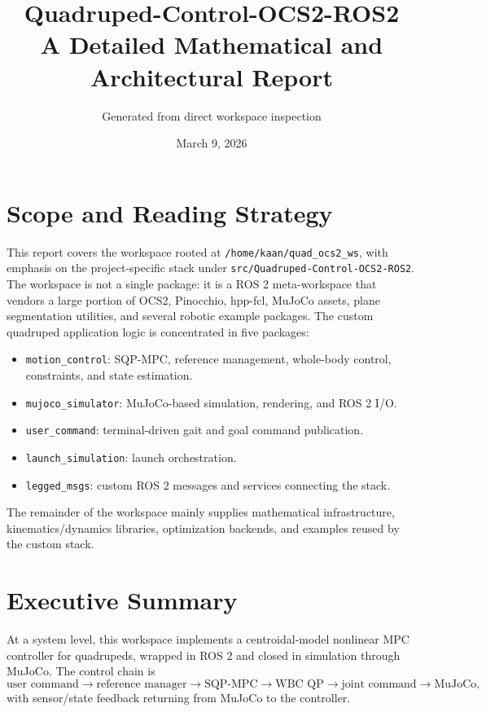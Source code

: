 \documentclass[11pt,a4paper]{article}
\title{\textbf{Quadruped-Control-OCS2-ROS2}\\A Detailed Mathematical and Architectural Report}
\author{Generated from direct workspace inspection}
\date{March 9, 2026}
\newcommand{\code}[1]{\texttt{#1}}
\begin{document}
\maketitle
\tableofcontents
\clearpage

\section{Scope and Reading Strategy}
This report covers the workspace rooted at \code{/home/kaan/quad\_ocs2\_ws}, with emphasis on the project-specific stack under \code{src/Quadruped-Control-OCS2-ROS2}. The workspace is not a single package: it is a ROS 2 meta-workspace that vendors a large portion of OCS2, Pinocchio, hpp-fcl, MuJoCo assets, plane segmentation utilities, and several robotic example packages. The custom quadruped application logic is concentrated in five packages:
\begin{itemize}[leftmargin=*]
\item \code{motion_control}: SQP-MPC, reference management, whole-body control, constraints, and state estimation.
\item \code{mujoco_simulator}: MuJoCo-based simulation, rendering, and ROS 2 I/O.
\item \code{user_command}: terminal-driven gait and goal command publication.
\item \code{launch_simulation}: launch orchestration.
\item \code{legged_msgs}: custom ROS 2 messages and services connecting the stack.
\end{itemize}

The remainder of the workspace mainly supplies mathematical infrastructure, kinematics/dynamics libraries, optimization backends, and examples reused by the custom stack.

\section{Executive Summary}
At a system level, this workspace implements a centroidal-model nonlinear MPC controller for quadrupeds, wrapped in ROS 2 and closed in simulation through MuJoCo. The control chain is
\begin{equation}
\text{user command} \rightarrow \text{reference manager} \rightarrow \text{SQP-MPC} \rightarrow \text{WBC QP} \rightarrow \text{joint command} \rightarrow \text{MuJoCo},
\end{equation}
with sensor/state feedback returning from MuJoCo to the controller.
\end{document}
